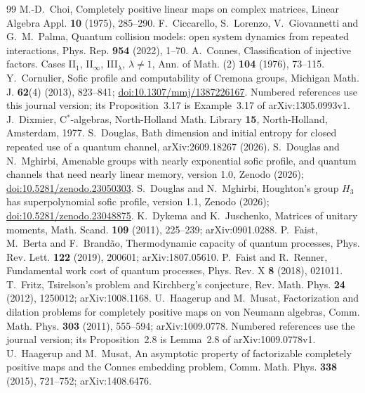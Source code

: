 \documentclass[11pt,a4paper]{article}
\theoremstyle{plain}
\theoremstyle{definition}
\theoremstyle{remark}
\begin{document}
\begin{thebibliography}{99}
 M.-D.~Choi, Completely positive linear maps on complex matrices, Linear Algebra Appl. \textbf{10} (1975), 285--290.
 F.~Ciccarello, S.~Lorenzo, V.~Giovannetti and G.~M.~Palma, Quantum collision models: open system dynamics from repeated interactions, Phys. Rep. \textbf{954} (2022), 1--70.
 A.~Connes, Classification of injective factors. Cases II$_1$, II$_\infty$, III$_\lambda$, $\lambda\ne1$, Ann. of Math. (2) \textbf{104} (1976), 73--115.
 Y.~Cornulier, Sofic profile and computability of Cremona groups, Michigan Math. J. \textbf{62}(4) (2013), 823--841; \href{https://doi.org/10.1307/mmj/1387226167}{doi:10.1307/mmj/1387226167}. Numbered references use this journal version; its Proposition~3.17 is Example~3.17 of arXiv:1305.0993v1.
 J.~Dixmier, C$^*$-algebras, North-Holland Math. Library \textbf{15}, North-Holland, Amsterdam, 1977.
 S.~Douglas, Bath dimension and initial entropy for closed repeated use of a quantum channel, arXiv:2609.18267 (2026).
 S.~Douglas and N.~Mghirbi, Amenable groups with nearly exponential sofic profile, and quantum channels that need
nearly linear memory, version 1.0, Zenodo (2026); \href{https://doi.org/10.5281/zenodo.23050303}{doi:10.5281/zenodo.23050303}.
 S.~Douglas and N.~Mghirbi, Houghton's group $H_3$ has superpolynomial sofic profile, version 1.1, Zenodo (2026); \href{https://doi.org/10.5281/zenodo.23048875}{doi:10.5281/zenodo.23048875}.
 K.~Dykema and K.~Juschenko, Matrices of unitary moments, Math. Scand. \textbf{109} (2011), 225--239; arXiv:0901.0288.
 P.~Faist, M.~Berta and F.~Brandão, Thermodynamic capacity of quantum processes, Phys. Rev. Lett. \textbf{122} (2019), 200601; arXiv:1807.05610.
 P.~Faist and R.~Renner, Fundamental work cost of quantum processes, Phys. Rev. X \textbf{8} (2018), 021011.
 T.~Fritz, Tsirelson's problem and Kirchberg's conjecture, Rev. Math. Phys. \textbf{24} (2012), 1250012; arXiv:1008.1168.
 U.~Haagerup and M.~Musat, Factorization and dilation problems for completely positive maps on von Neumann algebras, Comm. Math. Phys. \textbf{303} (2011), 555--594; arXiv:1009.0778. Numbered references use the journal version; its Proposition~2.8 is Lemma~2.8 of arXiv:1009.0778v1.
 U.~Haagerup and M.~Musat, An asymptotic property of factorizable completely positive maps and the Connes embedding problem, Comm. Math. Phys. \textbf{338} (2015), 721--752; arXiv:1408.6476.

\end{thebibliography}
\end{document}
